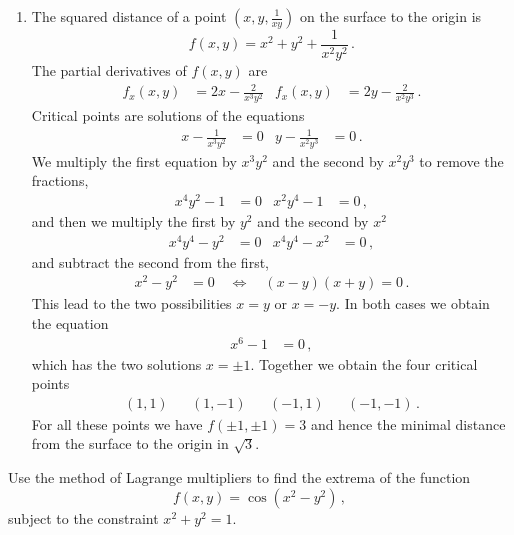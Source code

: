 \begin{solution}
\begin{enumerate}
\item
The squared distance of a point $\left(x, y, \frac{1}{xy}\right)$ on the surface to the origin is
\[
f(x,y) = x^2 + y^2 + \frac{1}{x^2y^2}\,.
\]
The partial derivatives of $f(x,y)$ are
\begin{align*}
f_x(x,y) &= 2x - \frac{2}{x^3y^2} &
f_x(x,y) &= 2y - \frac{2}{x^2y^3}\,.
\end{align*}
Critical points are solutions of the equations
\begin{align*}
x - \frac{1}{x^3y^2} &= 0 &
y - \frac{1}{x^2y^3} &= 0\,.
\end{align*}
We multiply the first equation by $x^3y^2$ and the second by $x^2 y^3$ to remove the fractions,
\begin{align*}
x^4y^2 - 1 &= 0 &
x^2 y^4 - 1 &= 0\,,
\end{align*}
and then we multiply the first by $y^2$ and the second by $x^2$
\begin{align*}
x^4y^4 - y^2 &= 0 &
x^4 y^4 - x^2 &= 0\,,
\end{align*}
and subtract the second from the first,
\begin{align*}
x^2 - y^2 &= 0
\quad\Leftrightarrow\quad
(x-y)(x+y) = 0\,.
\end{align*}
This lead to the two possibilities $x=y$ or $x=-y$. In both cases we obtain the equation
\begin{align*}
x^6 - 1 &= 0\,,
\end{align*}
which has the two solutions $x=\pm 1$. Together we obtain the four critical points
\begin{align*}
(1,1) &&
(1,-1) &&
(-1,1) &&
(-1,-1)\,.
\end{align*}
For all these points we have $f(\pm 1, \pm 1) =3$ and hence the minimal distance from the surface to the origin in $\sqrt{3}$.
\end{enumerate}
\end{solution}

\begin{question}
Use the method of Lagrange multipliers to find the extrema of the function
\[
f(x,y) = \cos(x^2 - y^2)\,,
\]
subject to the constraint $x^2 + y^2 = 1$.
\end{question}

